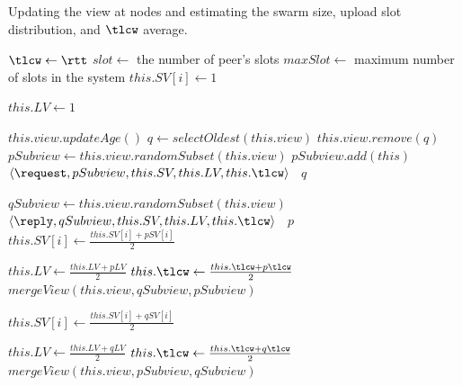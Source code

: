 \begin{algorithm}[!ht]
\caption{Updating the view at nodes and estimating the swarm size, upload slot distribution, and $\tlcw$ average.}
\begin{scriptsize}
\label{src:shuffle_view}
\PROCEDURE{\init()} {
   \INTEGER $\tlcw \gets \rtt$\;
   \INTEGER $slot \gets$ the number of peer's slots\;
   \INTEGER $maxSlot \gets$ maximum number of slots in the system\;
    {
      {
        $this.SV[i] \gets 1$\;
     } 
   }

    {
      $this.LV \gets 1$\;
   } 
}

\BlankLine
\BlankLine
{} {
  $this.view.updateAge()$\;
  $q \gets selectOldest(this.view)$\;
  $this.view.remove(q)$\;
  $pSubview \gets this.view.randomSubset(this.view)$\;
  $pSubview.add(this)$\;
  \SEND $\langle \request, pSubview, this.SV, this.LV, this.\tlcw \rangle$ \TO\ $q$\;
}

\BlankLine
\BlankLine
{} {
  $qSubview \gets this.view.randomSubset(this.view)$\;
  \SEND $\langle \reply, qSubview, this.SV, this.LV, this.\tlcw \rangle$ \TO\ $p$\;
   {
    $this.SV[i] \gets \frac{this.SV[i] + pSV[i]}{2}$\;
  }
  
  $this.LV \gets \frac{this.LV + pLV}{2}$\;
  $this.\tlcw \gets \frac{this.\tlcw + p\tlcw}{2}$\;
  $mergeView(this.view, qSubview, pSubview)$\;
}

\BlankLine
\BlankLine
{} {
   {
    $this.SV[i] \gets \frac{this.SV[i] + qSV[i]}{2}$ \;
  }
  
  $this.LV \gets \frac{this.LV + qLV}{2}$\;
  $this.\tlcw \gets \frac{this.\tlcw + q\tlcw}{2}$\;
  $mergeView(this.view, pSubview, qSubview)$\;
}

\BlankLine
\BlankLine
{}

\end{scriptsize}
\end{algorithm}

